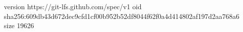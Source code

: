 version https://git-lfs.github.com/spec/v1
oid sha256:609db43d672dec9cfd1cf00b952b52df8044f62f0a4d414802af197d2aa768a6
size 19626
